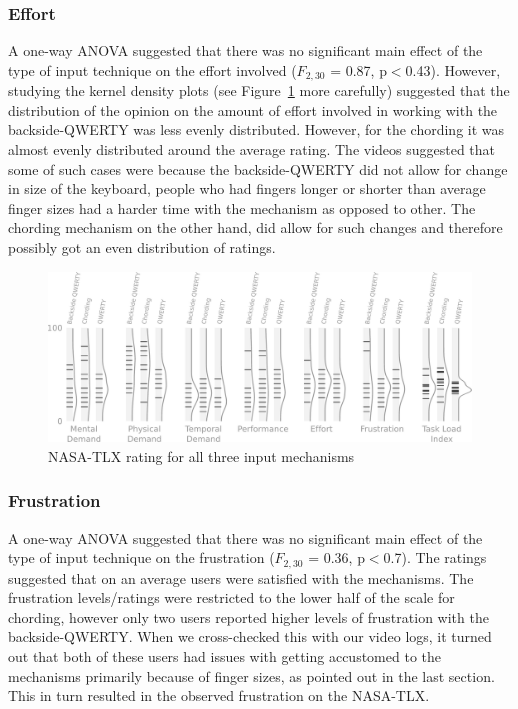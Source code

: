 \subsubsection{Effort}

A one-way ANOVA suggested that there was no significant main effect of the type of input technique on the effort involved ($F_{2,30}$ = 0.87, p$<$0.43). However, studying the kernel density plots (see Figure~\ref{fig:tlx-ratings} more carefully) suggested that the distribution of the opinion on the amount of effort involved in working with the backside-QWERTY was less evenly distributed. However, for the chording it was almost evenly distributed around the average rating. The videos suggested that some of such cases were because the backside-QWERTY did not allow for change in size of the keyboard, people who had fingers longer or shorter than average finger sizes had a harder time with the mechanism as opposed to other. The chording mechanism on the other hand, did allow for such changes and therefore possibly got an even distribution of ratings.

\begin{figure}
    \includegraphics[width=\textwidth]{Figures/hash_and_densities_index.pdf} 
    \caption{NASA-TLX rating for all three input mechanisms}
    \label{fig:tlx-ratings}
\end{figure}


\subsubsection{Frustration}

A one-way ANOVA suggested that there was no significant main effect of the type of input technique on the frustration ($F_{2,30}$ = 0.36, p$<$0.7). The ratings suggested that on an average users were satisfied with the mechanisms. The frustration levels/ratings were restricted to the lower half of the scale for chording, however only two users reported higher levels of frustration with the backside-QWERTY. When we cross-checked this with our video logs, it turned out that both of these users had issues with getting accustomed to the mechanisms primarily because of finger sizes, as pointed out in the last section. This in turn resulted in the observed frustration on the NASA-TLX.

